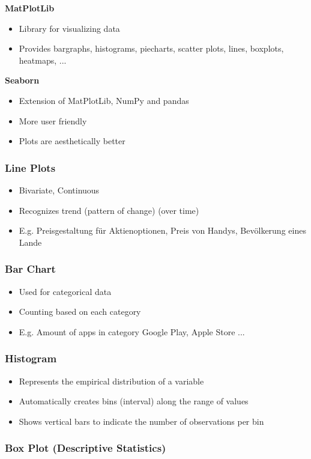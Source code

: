 \textbf{MatPlotLib}
\begin{itemize}
    \item Library for visualizing data
    \item Provides bargraphs, histograms, piecharts, scatter plots, lines, boxplots, heatmaps, ...
\end{itemize}

\textbf{Seaborn}
\begin{itemize}
    \item Extension of MatPlotLib, NumPy and pandas
    \item More user friendly
    \item Plots are aesthetically better
\end{itemize}

\subsubsection{Line Plots}
\begin{itemize}
    \item Bivariate, Continuous
    \item Recognizes trend (pattern of change) (over time)
    \item E.g. Preisgestaltung für Aktienoptionen, Preis von Handys, Bevölkerung eines Lande
\end{itemize}
\subsubsection{Bar Chart}
\begin{itemize}
    \item Used for categorical data
    \item Counting based on each category
    \item E.g. Amount of apps in category Google Play, Apple Store ...
\end{itemize}
\subsubsection{Histogram}
\begin{itemize}
    \item Represents the empirical distribution of a variable
    \item Automatically creates bins (interval) along the range of values
    \item Shows vertical bars to indicate the number of observations per bin
\end{itemize}
\subsubsection{Box Plot (Descriptive Statistics)}

